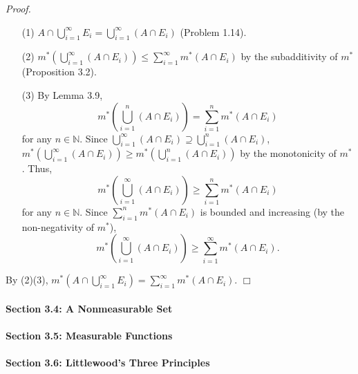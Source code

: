 \documentclass{article}
\begin{document}
\emph{Proof.}
\begin{enumerate}
\item[(1)]
$A \cap \bigcup_{i=1}^{\infty}E_i
= \bigcup_{i=1}^{\infty}(A \cap E_i)$ (Problem 1.14).
\item[(2)]
$m^{*}\left( \bigcup_{i=1}^{\infty}(A \cap E_i) \right)
\leq \sum_{i=1}^{\infty} m^{*}(A \cap E_i)$
by the subadditivity of $m^{*}$ (Proposition 3.2).
\item[(3)]
By Lemma 3.9,
$$m^{*}\left( \bigcup_{i=1}^{n}(A \cap E_i) \right)
= \sum_{i=1}^{n} m^{*}(A \cap E_i)$$
for any $n \in \mathbb{N}$.
Since
$\bigcup_{i=1}^{\infty}(A \cap E_i) \supseteq \bigcup_{i=1}^{n}(A \cap E_i)$,
$m^{*}\left( \bigcup_{i=1}^{\infty}(A \cap E_i) \right)
\geq m^{*}\left( \bigcup_{i=1}^{n}(A \cap E_i) \right)$ by the monotonicity of $m^{*}$.
Thus,
$$
m^{*}\left( \bigcup_{i=1}^{\infty}(A \cap E_i) \right)
\geq
\sum_{i=1}^{n} m^{*}(A \cap E_i)$$
for any $n \in \mathbb{N}$.
Since $\sum_{i=1}^{n} m^{*}(A \cap E_i)$ is bounded and increasing
(by the non-negativity of $m^{*}$),
$$
m^{*}\left( \bigcup_{i=1}^{\infty}(A \cap E_i) \right)
\geq
\sum_{i=1}^{\infty} m^{*}(A \cap E_i).$$
\end{enumerate}
By (2)(3),
$m^{*}\left( A \cap \bigcup_{i=1}^{\infty}E_i \right)
= \sum_{i=1}^{\infty} m^{*}(A \cap E_i)$.
$\Box$ \\\\






\textbf{\large Section 3.4: A Nonmeasurable Set} \\\\






\textbf{\large Section 3.5: Measurable Functions} \\\\






\textbf{\large Section 3.6: Littlewood's Three Principles} \\\\



\end{document}

